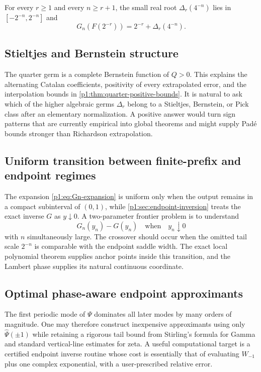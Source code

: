 \documentclass[11pt,oneside]{article}
\numberwithin{equation}{section}
\theoremstyle{definition}
\theoremstyle{remark}
\begin{document}
\begin{conjecture}
\label{p1:conj:natural-threshold}
For every $r\ge1$ and every $n\ge r+1$, the small real root
$\Delta_r(4^{-n})$ lies in $[-2^{-n},2^{-n}]$ and
\[
 G_n(F(2^{-r}))=2^{-r}+\Delta_r(4^{-n}).
\]
\end{conjecture}

\subsection{Stieltjes and Bernstein structure}

The quarter germ is a complete Bernstein function of $Q>0$.  This explains the alternating
Catalan coefficients, positivity of every extrapolated error, and the interpolation bounds in
\cref{p1:thm:quarter-positive-bounds}.  It is natural to ask which of the higher algebraic germs
$\Delta_r$ belong to a Stieltjes, Bernstein, or Pick class after an elementary normalization.
A positive answer would turn sign patterns that are currently empirical into global theorems
and might supply Pad\'e bounds stronger than Richardson extrapolation.

\subsection{Uniform transition between finite-prefix and endpoint regimes}

The expansion \eqref{p1:eq:Gn-expansion} is uniform only when the output remains in a compact
subinterval of $(0,1)$, while \cref{p1:sec:endpoint-inversion} treats the exact inverse $G$ as
$y\downarrow0$.  A two-parameter frontier problem is to understand
\begin{equation}
 G_n(y_n)-G(y_n)
 \quad\text{when}\quad y_n\downarrow0
 \label{p1:eq:double-scaling-problem}
\end{equation}
with $n$ simultaneously large.  The crossover should occur when the omitted tail scale
$2^{-n}$ is comparable with the endpoint saddle width.  The exact local polynomial theorem
supplies anchor points inside this transition, and the Lambert phase supplies its natural
continuous coordinate.

\subsection{Optimal phase-aware endpoint approximants}

The first periodic mode of $\Psi$ dominates all later modes by many orders of magnitude.
One may therefore construct inexpensive approximants using only
$\widehat\Psi(\pm1)$ while retaining a rigorous tail bound from Stirling's formula for Gamma
and standard vertical-line estimates for zeta.  A useful computational target is a certified
endpoint inverse routine whose cost is essentially that of evaluating $W_{-1}$ plus one
complex exponential, with a user-prescribed relative error.
\end{document}
